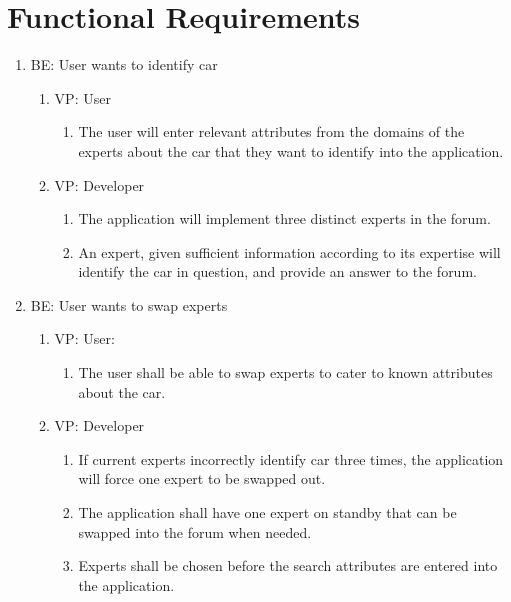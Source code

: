 \documentclass[12pt]{article}
\begin{document}
\section{Functional Requirements}
\begin{enumerate}
    \item BE: User wants to identify car
    \begin{enumerate}
        \item VP: User
        \begin{enumerate}
            \item The user will enter relevant attributes from the domains of the experts about the car that they want to identify into the application.
        \end{enumerate}
        \item VP: Developer
        \begin{enumerate}
            \item The application will implement three distinct experts in the forum.
            \item An expert, given sufficient information according to its expertise will identify the car in question, and provide an answer to the forum.
        \end{enumerate}
    \end{enumerate}
    
	\item BE: User wants to swap experts
	\begin{enumerate}
		\item VP: User:
		\begin{enumerate}
			\item The user shall be able to swap experts to cater to known attributes about the car.
		\end{enumerate}
		\item VP: Developer
		\begin{enumerate}
			\item If current experts incorrectly identify car three times, the application will force one expert to be swapped out.
			\item The application shall have one expert  on standby that can be swapped into the forum when needed.
			\item Experts shall be chosen before the search attributes are entered into the application.
		\end{enumerate}
	\end{enumerate}
	

\end{enumerate}
\end{document}
